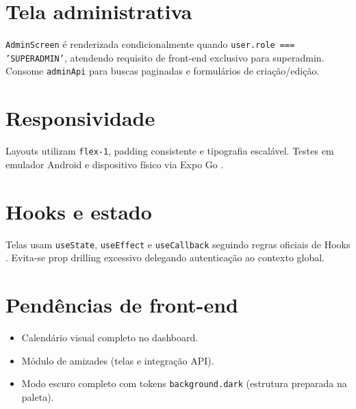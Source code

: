 \section{Tela administrativa}

\texttt{AdminScreen} é renderizada condicionalmente quando \texttt{user.role === 'SUPERADMIN'}, atendendo requisito de front-end exclusivo para superadmin. Consome \texttt{adminApi} para buscas paginadas e formulários de criação/edição.

\section{Responsividade}

Layouts utilizam \texttt{flex-1}, padding consistente e tipografia escalável. Testes em emulador Android e dispositivo físico via Expo Go \cite{expo_docs,youtube_expo_typescript}.

\section{Hooks e estado}

Telas usam \texttt{useState}, \texttt{useEffect} e \texttt{useCallback} seguindo regras oficiais de Hooks \cite{react_hooks_docs}. Evita-se prop drilling excessivo delegando autenticação ao contexto global.

\section{Pendências de front-end}

\begin{itemize}
    \item Calendário visual completo no dashboard.
    \item Módulo de amizades (telas e integração API).
    \item Modo escuro completo com tokens \texttt{background.dark} (estrutura preparada na paleta).
\end{itemize}
